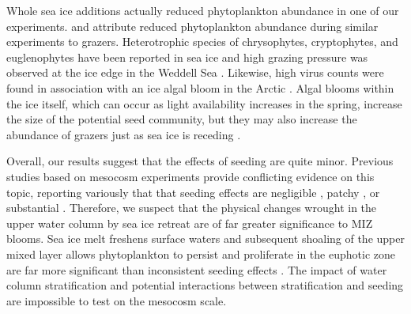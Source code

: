 Whole sea ice additions actually reduced phytoplankton abundance in one of our experiments. \citet{Mathot1991-nv} and \citet{Lannuzel2013-gk} attribute reduced phytoplankton abundance during similar experiments to grazers. Heterotrophic species of chrysophytes, cryptophytes, and euglenophytes have been reported in sea ice \citep{Ikavalko1997-ak,Lizotte2008-un} and high grazing pressure was observed at the ice edge in the Weddell Sea \citep{Riebesell1991-xy}. Likewise, high virus counts were found in association with an ice algal bloom in the Arctic \citep{Maranger1994-uk}. Algal blooms within the ice itself, which can occur as light availability increases in the spring, increase the size of the potential seed community, but they may also increase the abundance of grazers just as sea ice is receding \citep{Leu2015-at}. 

Overall, our results suggest that the effects of seeding are quite minor. Previous studies based on mesocosm experiments provide conflicting evidence on this topic, reporting variously that that seeding effects are negligible \citep{Riebesell1991-xy}, patchy \citep{Kuosa1992-vk}, or substantial \citep{Giesenhagen1999-kq,Lannuzel2013-gk}. Therefore, we suspect that the physical changes wrought in the upper water column by sea ice retreat are of far greater significance to MIZ blooms. Sea ice melt freshens surface waters and subsequent shoaling of the upper mixed layer allows phytoplankton to persist and proliferate in the euphotic zone are far more significant than inconsistent seeding effects \citep{saba2014winter,Venables2013-me,Vernet2008-on}. The impact of water column stratification and potential interactions between stratification and seeding are impossible to test on the mesocosm scale.

